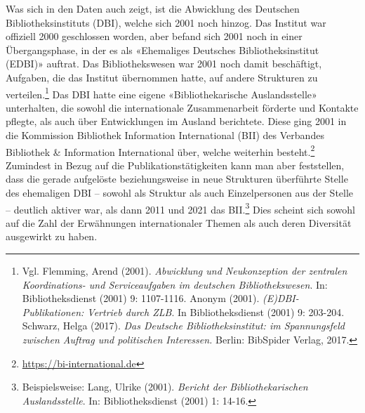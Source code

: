 \documentclass[a4paper,
fontsize=11pt,
oneside,
numbers=noperiodatend,
parskip=half-,
bibliography=totoc,
final
]{scrartcl}
\begin{document}
Was sich in den Daten auch zeigt, ist die Abwicklung des Deutschen
Bibliotheksinstituts (DBI), welche sich 2001 noch hinzog. Das Institut
war offiziell 2000 geschlossen worden, aber befand sich 2001 noch in
einer Übergangsphase, in der es als «Ehemaliges Deutsches
Bibliotheksinstitut (EDBI)» auftrat. Das Bibliothekswesen war 2001 noch
damit beschäftigt, Aufgaben, die das Institut übernommen hatte, auf
andere Strukturen zu verteilen.\footnote{Vgl. Flemming, Arend (2001).
  \emph{Abwicklung und Neukonzeption der zentralen Koordinations- und
  Serviceaufgaben im deutschen Bibliothekswesen}. In: Bibliotheksdienst
  (2001) 9: 1107-1116. Anonym (2001). \emph{(E)DBI-Publikationen:
  Vertrieb durch ZLB}. In Bibliotheksdienst (2001) 9: 203-204. Schwarz,
  Helga (2017). \emph{Das Deutsche Bibliotheksinstitut: im Spannungsfeld
  zwischen Auftrag und politischen Interessen.} Berlin: BibSpider
  Verlag, 2017.} Das DBI hatte eine eigene «Bibliothekarische
Auslandsstelle» unterhalten, die sowohl die internationale
Zusammenarbeit förderte und Kontakte pflegte, als auch über
Entwicklungen im Ausland berichtete. Diese ging 2001 in die Kommission
Bibliothek Information International (BII) des Verbandes Bibliothek \&
Information International über, welche weiterhin besteht.\footnote{\url{https://bi-international.de}}
Zumindest in Bezug auf die Publikationstätigkeiten kann man aber
feststellen, dass die gerade aufgelöste beziehungsweise in neue
Strukturen überführte Stelle des ehemaligen DBI -- sowohl als Struktur
als auch Einzelpersonen aus der Stelle -- deutlich aktiver war, als dann
2011 und 2021 das BII.\footnote{Beispielsweise: Lang, Ulrike (2001).
  \emph{Bericht der Bibliothekarischen Auslandsstelle}. In:
  Bibliotheksdienst (2001) 1: 14-16.} Dies scheint sich sowohl auf die
Zahl der Erwähnungen internationaler Themen als auch deren Diversität
ausgewirkt zu haben.
\end{document}
